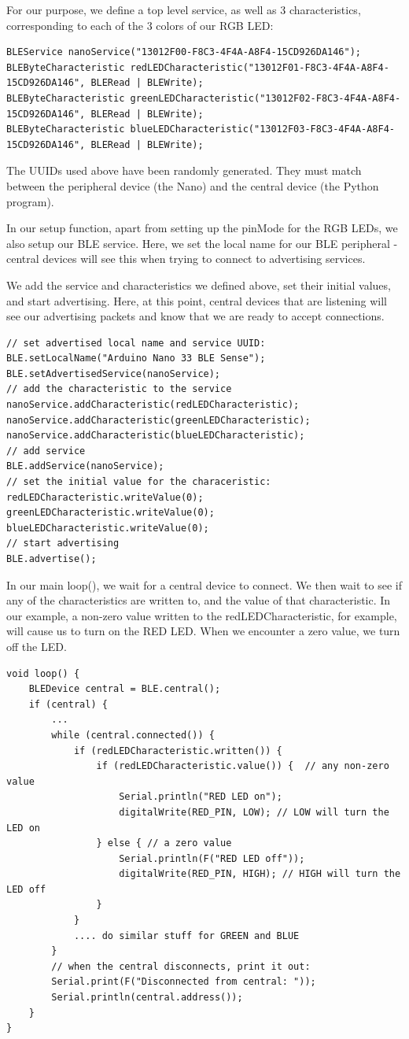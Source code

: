 For our purpose, we define a top level service, as well as 3 characteristics, corresponding to each of the 3 colors of our RGB LED:


\begin{lstlisting}
BLEService nanoService("13012F00-F8C3-4F4A-A8F4-15CD926DA146"); 
BLEByteCharacteristic redLEDCharacteristic("13012F01-F8C3-4F4A-A8F4-15CD926DA146", BLERead | BLEWrite);
BLEByteCharacteristic greenLEDCharacteristic("13012F02-F8C3-4F4A-A8F4-15CD926DA146", BLERead | BLEWrite);
BLEByteCharacteristic blueLEDCharacteristic("13012F03-F8C3-4F4A-A8F4-15CD926DA146", BLERead | BLEWrite);
\end{lstlisting}

The UUIDs used above have been randomly generated. They must match between the peripheral device (the Nano) and the central device (the Python program).

In our setup function, apart from setting up the pinMode for the RGB LEDs, we also setup our BLE service. Here, we set the local name for our BLE peripheral - central devices will see this when trying to connect to advertising services.

We add the service and characteristics we defined above, set their initial values, and start advertising. Here, at this point, central devices that are listening will see our advertising packets and know that we are ready to accept connections.


\begin{lstlisting}
// set advertised local name and service UUID:
BLE.setLocalName("Arduino Nano 33 BLE Sense");
BLE.setAdvertisedService(nanoService);
// add the characteristic to the service
nanoService.addCharacteristic(redLEDCharacteristic);
nanoService.addCharacteristic(greenLEDCharacteristic);
nanoService.addCharacteristic(blueLEDCharacteristic);
// add service
BLE.addService(nanoService);
// set the initial value for the characeristic:
redLEDCharacteristic.writeValue(0);
greenLEDCharacteristic.writeValue(0);
blueLEDCharacteristic.writeValue(0);
// start advertising
BLE.advertise();
\end{lstlisting}

In our main loop(), we wait for a central device to connect. We then wait to see if any of the characteristics are written to, and the value of that characteristic. In our example, a non-zero value written to the redLEDCharacteristic, for example, will cause us to turn on the RED LED. When we encounter a zero value, we turn off the LED.

\begin{lstlisting}
void loop() {
	BLEDevice central = BLE.central();
	if (central) {
		...
		while (central.connected()) {
			if (redLEDCharacteristic.written()) {
				if (redLEDCharacteristic.value()) {  // any non-zero value
					Serial.println("RED LED on");
					digitalWrite(RED_PIN, LOW); // LOW will turn the LED on
				} else { // a zero value
					Serial.println(F("RED LED off"));
					digitalWrite(RED_PIN, HIGH); // HIGH will turn the LED off
				}
			} 
			.... do similar stuff for GREEN and BLUE
		}
		// when the central disconnects, print it out:
		Serial.print(F("Disconnected from central: "));
		Serial.println(central.address());
	}
}
\end{lstlisting}

